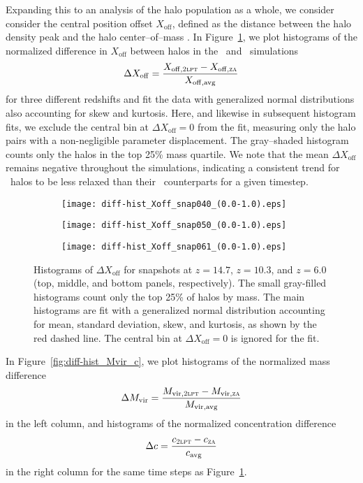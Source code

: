 Expanding this to an analysis of the halo population as a whole, we consider consider the central position offset $X_{\mathrm{off}}$, defined as the distance between the halo density peak and the halo center--of--mass \citep{2013ApJ...762..109B}.  In Figure~\ref{fig:diff-hist_Xoff}, we plot histograms of the normalized difference in $X_{\mathrm{off}}$ between halos in the \lpt\ and \za\ simulations
\begin{equation} \label{eq:delta_Xoff}
	\Delta X_{\mathrm{off}} = \frac{X_{\mathrm{off},\textsc{2lpt}} - X_{\mathrm{off},\textsc{za}}}{X_{\mathrm{off,avg}}}
\end{equation}
for three different redshifts and fit the data with generalized normal distributions also accounting for skew and kurtosis.  Here, and likewise in subsequent histogram fits, we exclude the central bin at $\Delta X_{\mathrm{off}} = 0$ from the fit, measuring only the halo pairs with a non-negligible parameter displacement.  The gray--shaded histogram counts only the halos in the top 25\% mass quartile.  We note that the mean $\Delta X_{\mathrm{off}}$ remains negative throughout the simulations, indicating a consistent trend for \za\ halos to be less relaxed than their \lpt\ counterparts for a given timestep.

\begin{figure}[t]
	\centering
	\begin{subfigure}{}
		\texttt{[image: diff-hist\_Xoff\_snap040\_(0.0-1.0).eps]}
	\end{subfigure}
	\begin{subfigure}{}
		\texttt{[image: diff-hist\_Xoff\_snap050\_(0.0-1.0).eps]}
	\end{subfigure}
	\begin{subfigure}{}
		\texttt{[image: diff-hist\_Xoff\_snap061\_(0.0-1.0).eps]}
	\end{subfigure}
	\caption[Histograms of $\Delta X_{\mathrm{off}}$]{\footnotesize Histograms of $\Delta X_{\mathrm{off}}$ for snapshots at $z = 14.7$, $z = 10.3$, and $z = 6.0$ (top, middle, and bottom panels, respectively).  The small gray-filled histograms count only the top 25\% of halos by mass.  The main histograms are fit with a generalized normal distribution accounting for mean, standard deviation, skew, and kurtosis, as shown by the red dashed line.  The central bin at $\Delta X_{\mathrm{off}} = 0$ is ignored for the fit.}
	\label{fig:diff-hist_Xoff}
\end{figure}

In Figure~\ref{fig:diff-hist_Mvir_c}, we plot histograms of the normalized mass difference 
\begin{equation} \label{eq:delta_Mvir}
	\Delta M_{\mathrm{vir}} = \frac{M_{\mathrm{vir},\textsc{2lpt}} - M_{\mathrm{vir},\textsc{za}}}{M_{\mathrm{vir,avg}}}
\end{equation}
in the left column, and histograms of the normalized concentration difference
\begin{equation} \label{eq:delta_c}
	\Delta c = \frac{c_{\textsc{2lpt}} - c_{\textsc{za}}}{c_{\mathrm{avg}}}
\end{equation}
in the right column for the same time steps as Figure~\ref{fig:diff-hist_Xoff}.

